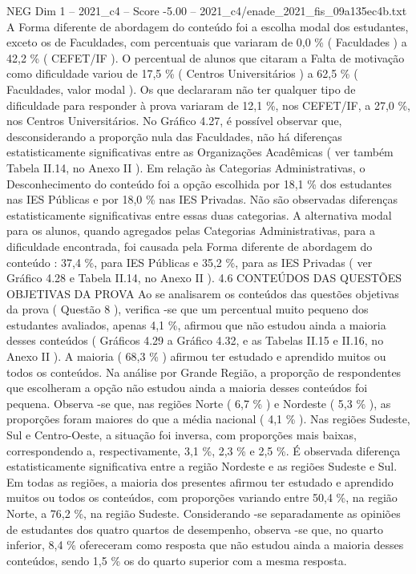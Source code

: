 \begin{textsample}{NEG Dim 1 – 2021\_c4 – Score -5.00 – 2021\_c4/enade\_2021\_fis\_09a135ec4b.txt}
A Forma diferente de abordagem do conteúdo foi a escolha modal dos estudantes, exceto os de Faculdades, com percentuais que variaram de 0,0 \% ( Faculdades ) a 42,2 \% ( CEFET/IF ).
O percentual de alunos que citaram a Falta de motivação como dificuldade variou de 17,5 \% ( Centros Universitários ) a 62,5 \% ( Faculdades, valor modal ).
Os que declararam não ter qualquer tipo de dificuldade para responder à prova variaram de 12,1 \%, nos CEFET/IF, a 27,0 \%, nos Centros Universitários.
No Gráfico 4.27, é possível observar que, desconsiderando a proporção nula das Faculdades, não há diferenças estatisticamente significativas entre as Organizações Acadêmicas ( ver também Tabela II.14, no Anexo II ).
Em relação às Categorias Administrativas, o Desconhecimento do conteúdo foi a opção escolhida por 18,1 \% dos estudantes nas IES Públicas e por 18,0 \% nas IES Privadas.
Não são observadas diferenças estatisticamente significativas entre essas duas categorias.
A alternativa modal para os alunos, quando agregados pelas Categorias Administrativas, para a dificuldade encontrada, foi causada pela Forma diferente de abordagem do conteúdo : 37,4 \%, para IES Públicas e 35,2 \%, para as IES Privadas ( ver Gráfico 4.28 e Tabela II.14, no Anexo II ). 4.6 CONTEÚDOS DAS QUESTÕES OBJETIVAS DA PROVA Ao se analisarem os conteúdos das questões objetivas da prova ( Questão 8 ), verifica -se que um percentual muito pequeno dos estudantes avaliados, apenas 4,1 \%, afirmou que não estudou ainda a maioria desses conteúdos ( Gráficos 4.29 a Gráfico 4.32, e as Tabelas II.15 e II.16, no Anexo II ).
A maioria ( 68,3 \% ) afirmou ter estudado e aprendido muitos ou todos os conteúdos.
Na análise por Grande Região, a proporção de respondentes que escolheram a opção não estudou ainda a maioria desses conteúdos foi pequena.
Observa -se que, nas regiões Norte ( 6,7 \% ) e Nordeste ( 5,3 \% ), as proporções foram maiores do que a média nacional ( 4,1 \% ).
Nas regiões Sudeste, Sul e Centro-Oeste, a situação foi inversa, com proporções mais baixas, correspondendo a, respectivamente, 3,1 \%, 2,3 \% e 2,5 \%.
É observada diferença estatisticamente significativa entre a região Nordeste e as regiões Sudeste e Sul.
Em todas as regiões, a maioria dos presentes afirmou ter estudado e aprendido muitos ou todos os conteúdos, com proporções variando entre 50,4 \%, na região Norte, a 76,2 \%, na região Sudeste.
Considerando -se separadamente as opiniões de estudantes dos quatro quartos de desempenho, observa -se que, no quarto inferior, 8,4 \% ofereceram como resposta que não estudou ainda a maioria desses conteúdos, sendo 1,5 \% os do quarto superior com a mesma resposta.

\end{textsample}

